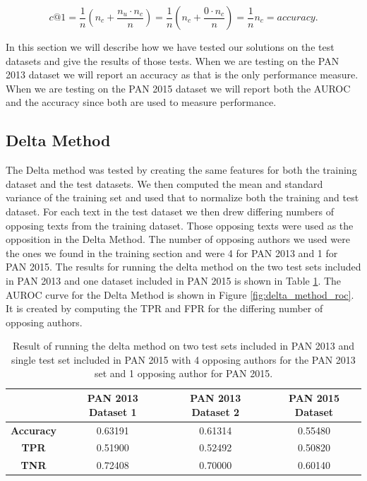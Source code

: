 \begin{equation}
    c@1 = \frac{1}{n} \left(n_c + \frac{n_u \cdot n_c}{n}\right)
        = \frac{1}{n} \left(n_c + \frac{0 \cdot n_c}{n}\right)
        = \frac{1}{n} n_c
        = accuracy.
\end{equation}

In this section we will describe how we have tested our solutions on the test
datasets and give the results of those tests. When we are testing on the PAN
2013 dataset we will report an accuracy as that is the only performance measure.
When we are testing on the PAN 2015 dataset we will report both the \gls{AUROC}
and the accuracy since both are used to measure performance.

\subsection{Delta Method} \label{subsec:results:delta_method}
The Delta method was tested by creating the same features for both the training
dataset and the test datasets. We then computed the mean and standard variance
of the training set and used that to normalize both the training and test
dataset. For each text in the test dataset we then drew differing numbers of
opposing texts from the training dataset. Those opposing texts were used as
the opposition in the Delta Method. The number of opposing authors we used
were the ones we found in the training section and were 4 for PAN 2013 and 1
for PAN 2015. The results for running the delta method on the two test sets
included in PAN 2013 and one dataset included in PAN 2015 is shown in Table
\ref{tab:delta_method_final_results}. The \gls{AUROC} curve for the Delta Method
is shown in Figure \ref{fig:delta_method_roc}. It is created by computing the
\gls{TPR} and \gls{FPR} for the differing number of opposing authors.

\begin{table}
    \centering
    \begin{tabular}{c|ccc}
        & \textbf{PAN 2013 Dataset 1} & \textbf{PAN 2013 Dataset 2} & \textbf{PAN 2015 Dataset}\\
        \hline
        \textbf{Accuracy}  & 0.63191 & 0.61314 & 0.55480 \\
        \textbf{\gls{TPR}} & 0.51900 & 0.52492 & 0.50820 \\
        \textbf{\gls{TNR}} & 0.72408 & 0.70000 & 0.60140
    \end{tabular}
    \caption{Result of running the delta method on two test sets included in PAN
    2013 and single test set included in PAN 2015 with 4 opposing authors for
    the PAN 2013 set and 1 opposing author for PAN 2015.}
    \label{tab:delta_method_final_results}
\end{table}

